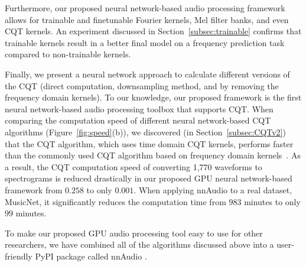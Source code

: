 \documentclass{ieeeaccess}
\begin{document}
{Furthermore, our proposed neural network-based audio processing framework allows for trainable and finetunable Fourier kernels, Mel filter banks, and even CQT kernels. An experiment discussed in Section~\ref{subsec:trainable} confirms that trainable kernels result in a better final model on a frequency prediction task compared to non-trainable kernels. }

{Finally, we present a neural network approach to calculate different versions of the CQT (direct computation, downsampling method, and by removing the frequency domain kernels). To our knowledge, our proposed framework is the first neural network-based audio processing toolbox that supports CQT. When comparing the computation speed of different neural network-based CQT algorithms (Figure~\ref{fig:speed}(b)), we discovered (in Section~\ref{subsec:CQTv2}) that the CQT algorithm, which uses time domain CQT kernels, performs faster than the commonly used CQT algorithm based on frequency domain kernels~\cite{brown1992efficient, schorkhuber2010constant}. As a result, the CQT computation speed of converting 1,770 waveforms to spectrograms is reduced drastically in our proposed GPU neural network-based framework from $0.258$ to only $0.001$. When applying nnAudio to a real dataset, MusicNet, it significantly reduces the computation time from $983$ minutes to only $99$ minutes.} 



To make our proposed GPU audio processing tool easy to use for other researchers, we have combined all of the algorithms discussed above into a user-friendly PyPI package called nnAudio \footnotemark[2].



\end{document}

